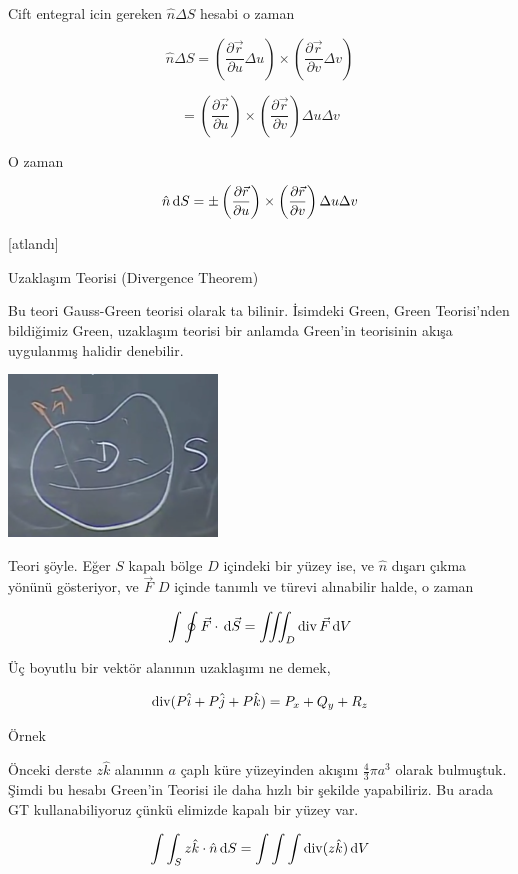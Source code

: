 \documentclass[12pt,fleqn]{article}\usepackage{../../common}
\begin{document}
Cift entegral icin gereken $\hat{n} \Delta S$ hesabi o zaman

$$
\hat{n} \Delta S =
\left( \frac{\partial \vec{r}}{\partial u} \Delta u \right) \times
\left( \frac{\partial \vec{r}}{\partial v} \Delta v \right) 
$$

$$
= \left( \frac{\partial \vec{r}}{\partial u} \right) \times
\left( \frac{\partial \vec{r}}{\partial v}  \right) \Delta u \Delta v
$$

O zaman

$$
\hat{n} \,\mathrm{d} S = \pm
\left( \frac{\partial \vec{r}}{\partial u} \right) \times
\left( \frac{\partial \vec{r}}{\partial v}  \right) \Delta u \Delta v
$$

[atlandı]

Uzaklaşım Teorisi (Divergence Theorem)

Bu teori Gauss-Green teorisi olarak ta bilinir. İsimdeki Green, Green
Teorisi'nden bildiğimiz Green, uzaklaşım teorisi bir anlamda Green'in teorisinin
akışa uygulanmış halidir denebilir.

\includegraphics[width=15em]{calc_multi_28_06.png}

Teori şöyle. Eğer $S$ kapalı bölge $D$ içindeki bir yüzey ise, ve $\hat{n}$
dışarı çıkma yönünü gösteriyor, ve $\vec{F}$ $D$ içinde tanımlı ve türevi
alınabilir halde, o zaman

$$
\int \oint \vec{F} \cdot \,\mathrm{d} \vec{S} =
\iiint_D \operatorname{div} \vec{F} \,\mathrm{d} V
$$

Üç boyutlu bir vektör alanının uzaklaşımı ne demek,

$$
\operatorname{div} (P \hat{i} + P \hat{j} + P \hat{k} ) = P_x + Q_y + R_z
$$

Örnek

Önceki derste $z \hat{k}$ alanının $a$ çaplı küre yüzeyinden akışını
$\frac{4}{3} \pi a^3$ olarak bulmuştuk. Şimdi bu hesabı Green'in Teorisi
ile daha hızlı bir şekilde yapabiliriz. Bu arada GT kullanabiliyoruz çünkü
elimizde kapalı bir yüzey var.

$$
\int \int_S z \hat{k} \cdot \hat{n} \,\mathrm{d} S =
\int \int \int \operatorname{div} (z\hat{k}) \,\mathrm{d} V
$$
\end{document}
